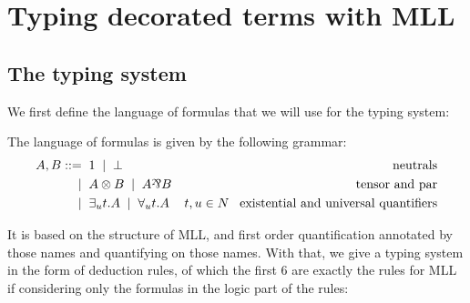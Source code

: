 \section{Typing decorated terms with MLL}

\subsection{The typing system}

We first define the language of formulas that we will use for the typing system:
\begin{definition}
The language of formulas is given by the following grammar:
\begin{align*}
A,B::=	&\;\; 1 \;\; | \;\; \bot							& \text{neutrals}\\
	|	&\;\; A \logtensor B \;\; | \;\; A \logpar B		& \text{tensor and par}\\
	|	&\;\; \exists_ut.A \;\; | \;\; \forall_ut.A		& t,u\in N\;\;\; \text{existential and universal quantifiers}
\end{align*}
\end{definition}

It is based on the structure of MLL, and first order quantification annotated by those names and quantifying on those names. With that, we give a typing system in the form of deduction rules, of which the first 6 are exactly the rules for MLL if considering only the formulas in the logic part of the rules: 

